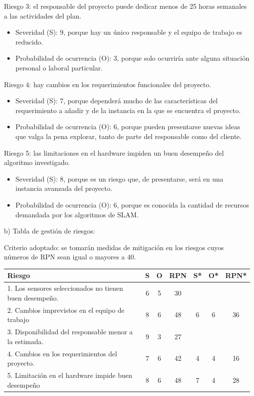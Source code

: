 \documentclass[
11pt, %
codirector, %
]{charter}
\begin{document}
Riesgo 3: el responsable del proyecto puede dedicar menos de 25 horas semanales a las actividades del plan.
\begin{itemize}
	\item Severidad (S): 9, porque hay un único responsable y el equipo de trabajo es reducido.
	\item Probabilidad de ocurrencia (O): 3, porque solo ocurriría ante alguna situación personal o laboral particular.
\end{itemize}

Riesgo 4: hay cambios en los requerimientos funcionales del proyecto.
\begin{itemize}
	\item Severidad (S): 7, porque dependerá mucho de las características del requerimiento a añadir y de la instancia en la que se encuentra el proyecto.
	\item Probabilidad de ocurrencia (O): 6, porque pueden presentarse nuevas ideas que valga la pena explorar, tanto de parte del responsable como del cliente.
\end{itemize}

Riesgo 5: las limitaciones en el hardware impiden un buen desempeño del algoritmo investigado.
\begin{itemize}
	\item Severidad (S): 8, porque es un riesgo que, de presentarse, será en una instancia avanzada del proyecto.
	\item Probabilidad de ocurrencia (O): 6, porque es conocida la cantidad de recursos demandada por los algoritmos de SLAM.
\end{itemize}

b) Tabla de gestión de riesgos:

Criterio adoptado: se tomarán medidas de mitigación en los riesgos cuyos números de RPN sean igual o mayores a 40.
\begin{table}[htpb]
\centering
\begin{tabularx}{\linewidth}{@{}|X|c|c|c|c|c|c|@{}}
\hline
\rowcolor[HTML]{C0C0C0}
Riesgo 													& S & O & RPN & S* & O* & RPN*  \\ \hline
1. Los sensores seleccionados no tienen buen desempeño. & 6 & 5 & 30  &   &     &  		\\ \hline
2. Cambios imprevistos en el equipo de trabajo       	& 8 & 6 & 48  & 6 & 6   & 36  	\\ \hline
3. Disponibilidad del responsable menor a la estimada.  & 9 & 3 & 27  &   &     &   	\\ \hline
4. Cambios en los requerimientos del proyecto.     		& 7 & 6 & 42 & 4  & 4   & 16  	\\ \hline
5. Limitación en el hardware impide buen desempeño     	& 8 & 6 & 48 & 7  & 4   & 28  	\\ \hline
\end{tabularx}%
\end{table}
\end{document}
